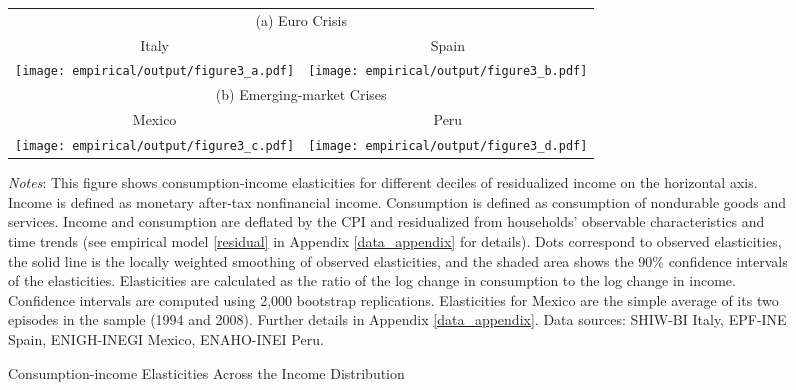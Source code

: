 \documentclass[12pt]{article}
\begin{document}
\begin{spacing}{1.5}
\begin{table}[H]
\end{table}


\begin{figure}[H]
\begin{tabular}{cc}
\multicolumn{2}{c}{(a) Euro Crisis} \vspace{.4em}  \\
{\small{}{Italy} } & {\small{}{Spain} } \tabularnewline
\texttt{[image: empirical/output/figure3\_a.pdf]} &
\texttt{[image: empirical/output/figure3\_b.pdf]}   \\
\multicolumn{2}{c}{(b) Emerging-market Crises} \vspace{.4em} \\
{\small{}{Mexico} } & {\small{}{Peru} }\tabularnewline
\texttt{[image: empirical/output/figure3\_c.pdf]} &
\texttt{[image: empirical/output/figure3\_d.pdf]}   \\
\end{tabular}\caption{Consumption-income Elasticities Across the Income Distribution
\label{fig_elasticities_incomedecile_residualized}}
\medskip{}
\raggedright{}\textit{\footnotesize{}Notes}{\footnotesize{}: This figure shows consumption-income elasticities for different deciles of residualized income on the horizontal axis. Income is defined as monetary after-tax nonfinancial income. Consumption is defined as consumption of nondurable goods and services. Income and consumption are deflated by the CPI and residualized from households' observable characteristics and time trends (see empirical model \eqref{residual} in Appendix \ref{data_appendix} for details). Dots correspond to observed elasticities, the
solid line is the locally weighted smoothing of observed elasticities, and the shaded area shows the 90\% confidence intervals
of the elasticities. Elasticities are calculated as the ratio of the log change in consumption to the log change
in income. Confidence intervals are computed using 2,000 bootstrap replications. Elasticities for Mexico are the simple average of its two episodes in the sample (1994 and 2008).  Further details in Appendix \ref{data_appendix}. Data sources: SHIW-BI Italy, EPF-INE Spain, ENIGH-INEGI Mexico, ENAHO-INEI Peru.}{\footnotesize\par}
\end{figure}


\end{spacing}
\end{document}
